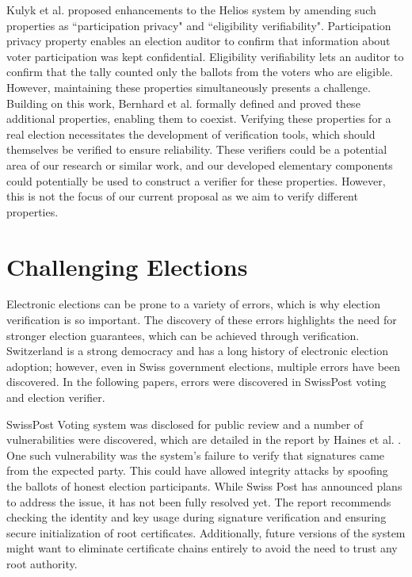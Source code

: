 Kulyk et al.\cite{Kulyk2015ExtendingHT}  proposed enhancements to the Helios \cite{Adida2008HeliosWO} system by amending such properties as ``participation privacy" and ``eligibility verifiability". Participation privacy property enables an election auditor to confirm that information about voter participation was kept confidential. Eligibility verifiability lets an auditor to confirm that the tally counted only the ballots from the voters who are eligible. However, maintaining these properties simultaneously presents a challenge. Building on this work, Bernhard et al.\cite{Bernhard2017SecurityPF} formally defined and proved these additional properties, enabling them to coexist. Verifying these properties for a real election necessitates the development of verification tools, which should themselves be verified to ensure reliability. These verifiers could be a potential area of our research or similar work, and our developed elementary components could potentially be used to construct a verifier for these properties. However, this is not the focus of our current proposal as we aim to verify different properties.

\section{Challenging Elections}
Electronic elections can be prone to a variety of errors, which is why election verification is so important. The discovery of these errors highlights the need for stronger election guarantees, which can be achieved through verification. Switzerland is a strong democracy and has a long history of electronic election adoption; however, even in Swiss government elections, multiple errors have been discovered. In the following papers, errors were discovered in SwissPost voting and election verifier.

SwissPost Voting system was disclosed for public review and a number of vulnerabilities were discovered, which are detailed in the report by Haines et al. \cite{Haines2022RunningTR}. One such vulnerability was the system's failure to verify that signatures came from the expected party. This could have allowed integrity attacks by spoofing the ballots of honest election participants. While Swiss Post has announced plans to address the issue, it has not been fully resolved yet. The report recommends checking the identity and key usage during signature verification and ensuring secure initialization of root certificates. Additionally, future versions of the system might want to eliminate certificate chains entirely to avoid the need to trust any root authority.

